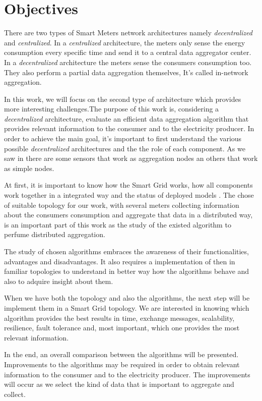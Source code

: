 \section{Objectives}
There are two types of Smart Meters network architectures\cite{journals/spm/ErkinTLP13} namely  \textit{decentralized} and \textit{centralized}. In a \textit{centralized} architecture, the meters only sense the energy consumption every specific time and send it to a central data aggregator center. In a \textit{decentralized} architecture the meters sense the consumers consumption too. They also perform a partial data aggregation themselves, It's called in-network aggregation\cite{journals/spm/ErkinTLP13}.

In this work, we will focus on the second type of architecture which provides more interesting challenges.The purpose of this work is, considering a \textit{decentralized} architecture, evaluate an efficient data aggregation algorithm that provides relevant information to the consumer and to the electricity producer. 
In order to achieve the main goal, it's important to first understand the various possible \textit{decentralized} architectures and the the role of each component. As  we saw in \cite{Girao2004c} there are some sensors that work as aggregation nodes an others that work as simple nodes. 

At first, it is important to know how the Smart Grid works, how all components work together in a integrated way and the status of deployed models . The chose of suitable topology for our work, with several meters collecting information about the consumers consumption and aggregate that data in a distributed way, is an important part of this work as the study of the existed algorithm to perfume distributed aggregation.

The study of chosen algorithms embraces the awareness of their functionalities, advantages and disadvantages. It also requires a implementation of then in familiar topologies to understand in better way how the algorithms behave and also to adquire insight about them. 

When we have both the topology and also the algorithms, the next step will be implement them in a Smart Grid topology. We are interested in knowing which algorithm provides the best results in time, exchange messages, scalability, resilience, fault tolerance and, most important, which one provides the most relevant information. 

In the end, an overall comparison between the algorithms will be presented. Improvements to the algorithms may be required in order to obtain relevant information to the consumer and to the electricity producer. The improvements will occur as we select the kind of data that is important to aggregate and collect.

